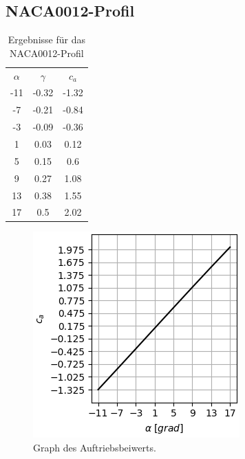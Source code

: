 \newpage
\subsection{NACA0012-Profil} 
\begin{minipage}{0.45\textwidth}
\begin{table}[H]
    \centering
    \begin{tabular}{c|cc}
    $\alpha$ & $\gamma$ & $c_a$ \\
        -11 & -0.32 & -1.32 \\ 
		-7 & -0.21 & -0.84 \\ 
		-3 & -0.09 & -0.36 \\ 
		1 & 0.03 & 0.12 \\ 
		5 & 0.15 & 0.6 \\ 
		9 & 0.27 & 1.08 \\ 
		13 & 0.38 & 1.55 \\ 
		17 & 0.5 & 2.02
    \end{tabular}
    \label{tab:naca}
    \caption{Ergebnisse für das NACA0012-Profil}
\end{table}
\end{minipage}
\hfill
\begin{minipage}{0.45\textwidth}
\begin{figure}[H]
    \centering
    \includegraphics[scale=0.6]{figures/nacaca.png}
    \caption{Graph des Auftriebsbeiwerts.}
    \label{fig:nacaca}
\end{figure}
\end{minipage}

